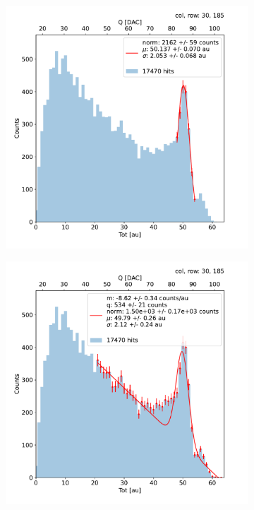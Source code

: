 \begin{figure}
\begin{subfigure}[b]{0.49\textwidth}
                \caption{}
                \label{fig:gauss_line_c68}
            \end{subfigure}\\
            \begin{subfigure}[b]{0.49\textwidth}
                \centering
                \includegraphics[width=\linewidth]{figures/charaterization/fit_gauss_r185.pdf}
                \caption{}
                \label{fig:gauss_c185}
            \end{subfigure}
            \hfill
            \begin{subfigure}[b]{0.49\textwidth}
                \centering
                \includegraphics[width=\linewidth]{figures/charaterization/fit_line_gauss_r185.pdf}      

\end{subfigure}
\end{figure}
